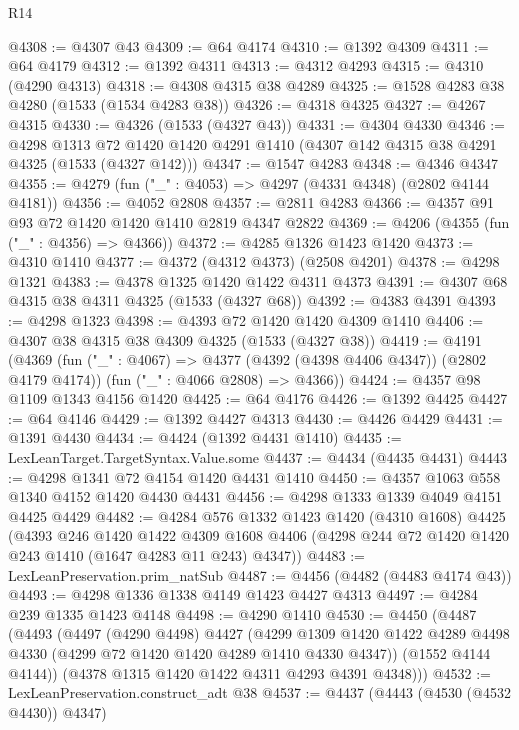 \begin{lexlean}{R14}
\begin{coremodule}
@4308 := @4307 @43
@4309 := @64 @4174
@4310 := @1392 @4309
@4311 := @64 @4179
@4312 := @1392 @4311
@4313 := @4312 @4293
@4315 := @4310 (@4290 @4313)
@4318 := @4308 @4315 @38 @4289
@4325 := @1528 @4283 @38 @4280 (@1533 (@1534 @4283 @38))
@4326 := @4318 @4325
@4327 := @4267 @4315
@4330 := @4326 (@1533 (@4327 @43))
@4331 := @4304 @4330
@4346 := @4298
    @1313
    @72
    @1420
    @1420
    @4291
    @1410
    (@4307 @142 @4315 @38 @4291 @4325 (@1533 (@4327 @142)))
@4347 := @1547 @4283
@4348 := @4346 @4347
@4355 := @4279 (fun ("_" : @4053) => @4297 (@4331 @4348) (@2802 @4144 @4181))
@4356 := @4052 @2808
@4357 := @2811 @4283
@4366 := @4357 @91 @93 @72 @1420 @1420 @1410 @2819 @4347 @2822
@4369 := @4206 (@4355 (fun ("_" : @4356) => @4366))
@4372 := @4285 @1326 @1423 @1420
@4373 := @4310 @1410
@4377 := @4372 (@4312 @4373) (@2508 @4201)
@4378 := @4298 @1321
@4383 := @4378 @1325 @1420 @1422 @4311 @4373
@4391 := @4307 @68 @4315 @38 @4311 @4325 (@1533 (@4327 @68))
@4392 := @4383 @4391
@4393 := @4298 @1323
@4398 := @4393 @72 @1420 @1420 @4309 @1410
@4406 := @4307 @38 @4315 @38 @4309 @4325 (@1533 (@4327 @38))
@4419 := @4191
    (@4369
      (fun ("_" : @4067) => @4377 (@4392 (@4398 @4406 @4347)) (@2802 @4179 @4174))
      (fun ("_" : @4066 @2808) => @4366))
@4424 := @4357 @98 @1109 @1343 @4156 @1420
@4425 := @64 @4176
@4426 := @1392 @4425
@4427 := @64 @4146
@4429 := @1392 @4427 @4313
@4430 := @4426 @4429
@4431 := @1391 @4430
@4434 := @4424 (@1392 @4431 @1410)
@4435 := LexLeanTarget.TargetSyntax.Value.some
@4437 := @4434 (@4435 @4431)
@4443 := @4298 @1341 @72 @4154 @1420 @4431 @1410
@4450 := @4357 @1063 @558 @1340 @4152 @1420 @4430 @4431
@4456 := @4298 @1333 @1339 @4049 @4151 @4425 @4429
@4482 := @4284
    @576
    @1332
    @1423
    @1420
    (@4310 @1608)
    @4425
    (@4393
      @246
      @1420
      @1422
      @4309
      @1608
      @4406
      (@4298 @244 @72 @1420 @1420 @243 @1410 (@1647 @4283 @11 @243) @4347))
@4483 := LexLeanPreservation.prim_natSub
@4487 := @4456 (@4482 (@4483 @4174 @43))
@4493 := @4298 @1336 @1338 @4149 @1423 @4427 @4313
@4497 := @4284 @239 @1335 @1423 @4148
@4498 := @4290 @1410
@4530 := @4450
    (@4487
      (@4493
        (@4497
          (@4290 @4498)
          @4427
          (@4299
            @1309
            @1420
            @1422
            @4289
            @4498
            @4330
            (@4299 @72 @1420 @1420 @4289 @1410 @4330 @4347))
          (@1552 @4144 @4144))
        (@4378 @1315 @1420 @1422 @4311 @4293 @4391 @4348)))
@4532 := LexLeanPreservation.construct_adt @38
@4537 := @4437 (@4443 (@4530 (@4532 @4430)) @4347)

\end{coremodule}
\end{lexlean}
